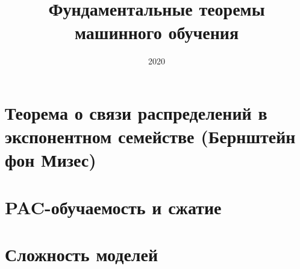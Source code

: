 \documentclass{article}
\title{Фундаментальные теоремы машинного обучения}
\date{2020}
\numberwithin{equation}{section}
\begin{document}
    \maketitle
    \tableofcontents
    \clearpage
    \section{Теорема о связи распределений в экспонентном семействе (Бернштейн фон Мизес)}
    {}
    \clearpage
    \section{PAC-обучаемость и сжатие}
    {}
    \clearpage
    \section{Сложность моделей}
    {}
    
    


\end{document}
